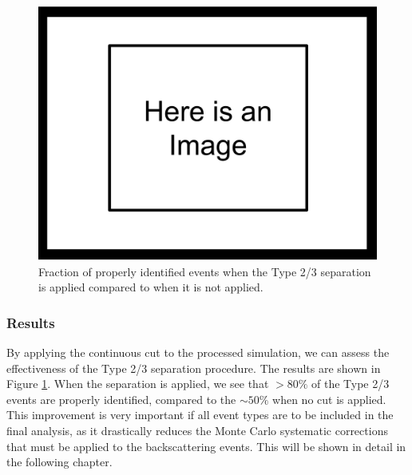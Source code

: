 \begin{figure}[h]
  \centering
  \includegraphics[scale=0.3,page=1]{4-UCNACalibrations/ImageHolder.pdf}
  \caption{Fraction of properly identified events when the Type 2/3
  separation is applied compared to when it is not applied.}
  \label{fig:sepResults}
\end{figure}

\subsubsection{Results}

By applying the continuous cut to the processed simulation, we can assess the
effectiveness of the Type 2/3 separation procedure. The results are shown in
Figure \ref{fig:sepResults}. When the separation is applied, we see that
$>80\%$ of the Type 2/3 events are properly identified, compared to the $\sim50\%$
when no cut is applied. This improvement is very important if all event types
are to be included in the final analysis, as it drastically reduces the
Monte Carlo systematic corrections that must be applied to the backscattering events.
This will be shown in detail in the following chapter.










